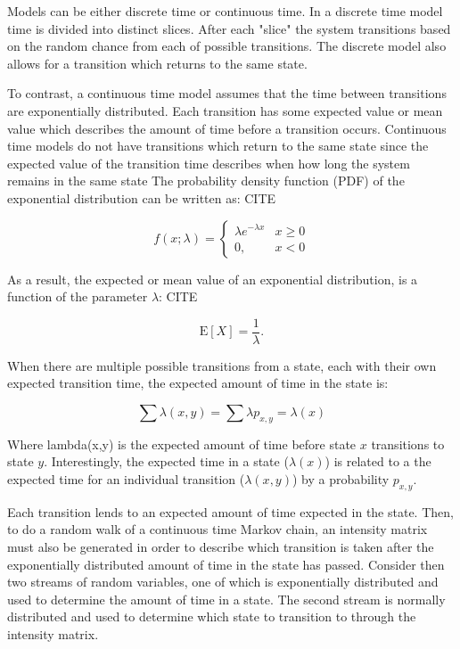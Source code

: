 Models can be either discrete time or continuous time. In a discrete time model
time is divided into distinct slices. After each "slice" the system transitions
based on the random chance from each of possible transitions. The discrete model
also allows for a transition which returns to the same state.

To contrast, a continuous time model assumes that the time between transitions
are exponentially distributed. Each transition has some expected value or mean
value which describes the amount of time before a transition occurs. Continuous
time models do not have transitions which return to the same state since the
expected value of the transition time describes when how long the system 
remains in the same state The probability density
function (PDF) of the exponential distribution can be written as: CITE

\begin{equation}
f(x;\lambda) = \begin{cases}
\lambda e^{-\lambda x} & x \ge 0 \\
0, & x < 0
\end{cases}
\end{equation}

As a result, the expected or mean value of an exponential distribution, is a function of
the parameter $\lambda$: CITE

\begin{equation}
\mathrm{E}[X] = \frac{1}{\lambda}. \!
\end{equation}

When there are multiple possible transitions from a state, each with their own expected transition time, the expected amount of time in the state is:

\begin{equation}
\sum \lambda(x,y) = \sum \lambda p_{x,y} = \lambda(x)
\end{equation}

Where lambda(x,y) is the expected amount of time before state $x$ transitions to state $y$. Interestingly, the expected time in a state ($\lambda(x)$) is related to a the expected time for an individual transition ($\lambda(x,y)$) by a probability $p_{x,y}$.

Each transition lends to an expected amount of time expected in the state. Then, to do a random walk of a continuous time Markov chain, an intensity matrix must also be generated in order to describe which transition is taken after the exponentially distributed amount of time in the state has passed. Consider then two streams of random variables, one of which is exponentially distributed and used to determine the amount of time in a state. The second stream is normally distributed and used to determine which state to transition to through the intensity matrix.

